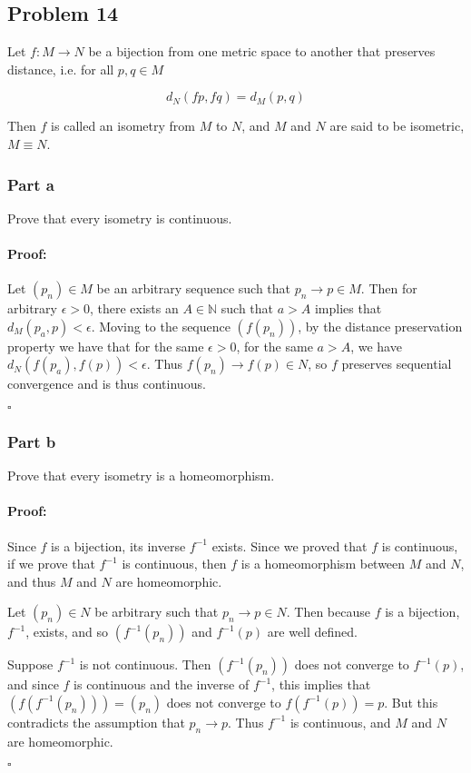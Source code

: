 \documentclass{article}
\newenvironment{proof}{\paragraph{Proof:}}{\hfill$\square$}
\begin{document}
\subsection*{Problem 14}

Let $f: M\rightarrow N$ be a bijection from one metric space to another that preserves distance, i.e. for all $p, q \in M$

\[
d_N(fp, fq) = d_M(p, q)
\]

Then $f$ is called an isometry from $M$ to $N$, and $M$ and $N$ are said to be isometric, $M \equiv N$.

\subsubsection*{Part a}

Prove that every isometry is continuous.

\begin{proof}

Let $(p_n) \in M$ be an arbitrary sequence such that $p_n \rightarrow p \in M$. Then for arbitrary $\epsilon > 0$, there exists an $A \in \mathbb{N}$ such that $a > A$ implies that $d_M(p_a, p) < \epsilon$. Moving to the sequence $(f(p_n))$, by the distance preservation property we have that for the same $\epsilon > 0$, for the same $a > A$, we have $d_N(f(p_a), f(p)) < \epsilon$. Thus $f(p_n) \rightarrow f(p) \in N$, so $f$ preserves sequential convergence and is thus continuous.

\end{proof}

\subsubsection*{Part b}

Prove that every isometry is a homeomorphism.

\begin{proof}

Since $f$ is a bijection, its inverse $f^{-1}$ exists. Since we proved that $f$ is continuous, if we prove that $f^{-1}$ is continuous, then $f$ is a homeomorphism between $M$ and $N$, and thus $M$ and $N$ are homeomorphic.

Let $(p_n) \in N$ be arbitrary such that $p_n \rightarrow p \in N$. Then because $f$ is a bijection, $f^{-1}$, exists, and so $(f^{-1}(p_n))$ and $f^{-1}(p)$ are well defined.

Suppose $f^{-1}$ is not continuous. Then $(f^{-1}(p_n))$ does not converge to $f^{-1}(p)$, and since $f$ is continuous and the inverse of $f^{-1}$, this implies that $(f(f^{-1}(p_n))) = (p_n)$ does not converge to $f(f^{-1}(p)) = p$. But this contradicts the assumption that $p_n \rightarrow p$. Thus $f^{-1}$ is continuous, and $M$ and $N$ are homeomorphic.

\end{proof}
\end{document}
